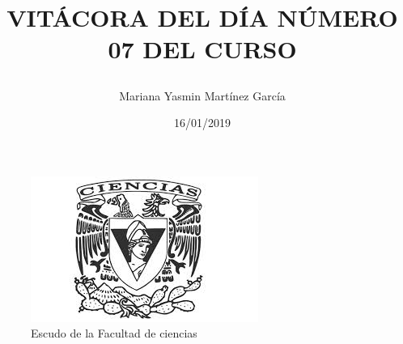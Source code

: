 \documentclass{article}
\title{\Huge\item\color{blue}\textbf{VITÁCORA DEL DÍA NÚMERO 07 DEL CURSO}}
\author{\Large Mariana Yasmin Martínez García}
\date{\Large 16/01/2019}
\begin{document}
\begin{figure}[t]
	\centering
	\includegraphics[width=0.4\linewidth]{Imagenes/1}
	\caption{Escudo de la Facultad de ciencias}
	\label{fig:1}
\end{figure}
	\maketitle
		
	\newpage
	
\end{document}
